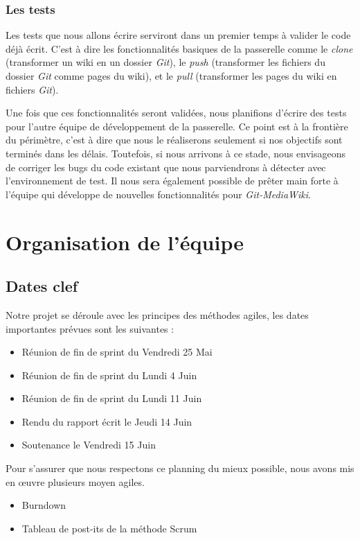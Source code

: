 \documentclass[11pt]{article}
\begin{document}
\subsubsection{Les tests}
Les tests que nous allons écrire serviront dans un premier temps à valider le code déjà écrit. C'est à dire les fonctionnalités basiques de la passerelle comme le \textit{clone} (transformer un wiki en un dossier \textit{Git}), le \textit{push} (transformer les fichiers du dossier \textit{Git} comme pages du wiki), et le \textit{pull} (transformer les pages du wiki en fichiers \textit{Git}).

Une fois que ces fonctionnalités seront validées, nous planifions d'écrire des tests pour l'autre équipe de développement de la passerelle. Ce point est à la frontière du périmètre, c'est à dire que nous le réaliserons seulement si nos objectifs sont terminés dans les délais. Toutefois, si nous arrivons à ce stade, nous envisageons de corriger les bugs du code existant que nous parviendrons à détecter avec l'environnement de test. Il nous sera également possible de prêter main forte à l'équipe qui développe de nouvelles fonctionnalités pour \textit{Git-MediaWiki}.

\section{Organisation de l'équipe}
\subsection{Dates clef}
Notre projet se déroule avec les principes des méthodes agiles, les dates importantes prévues sont les suivantes :

\begin{itemize}
\item Réunion de fin de sprint du Vendredi 25 Mai
\item Réunion de fin de sprint du Lundi 4 Juin
\item Réunion de fin de sprint du Lundi 11 Juin
\item Rendu du rapport écrit le Jeudi 14 Juin
\item Soutenance le Vendredi 15 Juin
\end{itemize}

Pour s'assurer que nous respectons ce planning du mieux possible, nous avons mis en œuvre plusieurs moyen agiles.\\
\begin{itemize}
\item Burndown
\item Tableau de post-its de la méthode Scrum
\end{itemize}
\end{document}
